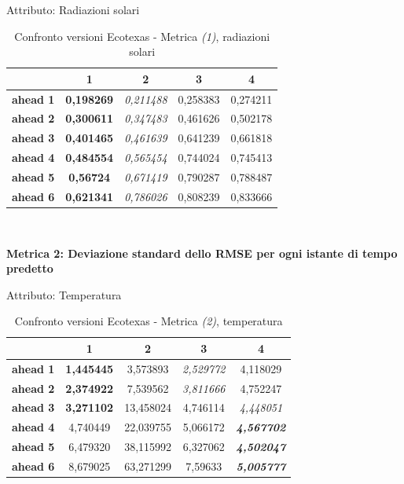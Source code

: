 \documentclass[12pt,a4paper,oneside,openright]{book}
\begin{document}
\medskip

Attributo: Radiazioni solari \\ 

\begin{table}[H]
\centering
\begin{tabular}{|c|c|c|c|c|}
\hline
& 1 & 2 & 3 & 4 \\
\hline
\textbf{ahead 1} & \textbf{0,198269} & \textit{0,211488} & 0,258383 & 0,274211\\
\hline
\textbf{ahead 2} & \textbf{0,300611} & \textit{0,347483} & 0,461626 & 0,502178\\ 
\hline
\textbf{ahead 3} & \textbf{0,401465} & \textit{0,461639} & 0,641239 & 0,661818\\
\hline
\textbf{ahead 4} & \textbf{0,484554} & \textit{0,565454} & 0,744024 & 0,745413\\ 
\hline
\textbf{ahead 5} & \textbf{0,56724} & \textit{0,671419} & 0,790287 & 0,788487\\
\hline
\textbf{ahead 6} & \textbf{0,621341} & \textit{0,786026} & 0,808239 & 0,833666\\ 
\hline
\end{tabular} \\
\caption{Confronto versioni Ecotexas - Metrica \textit{(1)}, radiazioni solari}
\end{table} 


\newpage

\textbf{Metrica 2: Deviazione standard dello RMSE per ogni istante di tempo predetto} 

\medskip

Attributo: Temperatura \\ 

\begin{table}[H]
\centering
\begin{tabular}{|c|c|c|c|c|}
\hline
& 1 & 2 & 3 & 4 \\
\hline
\textbf{ahead 1} & \textbf{1,445445} & 3,573893 & \textit{2,529772} & 4,118029\\
\hline
\textbf{ahead 2} & \textbf{2,374922} & 7,539562 & \textit{3,811666} & 4,752247\\ 
\hline
\textbf{ahead 3} & \textbf{3,271102} & 13,458024 & 4,746114 & \textit{4,448051}\\
\hline
\textbf{ahead 4} & 4,740449 & 22,039755 & 5,066172 & \textit{\textbf{4,567702}}\\ 
\hline
\textbf{ahead 5} & 6,479320 & 38,115992 & 6,327062 & \textit{\textbf{4,502047}}\\
\hline
\textbf{ahead 6} & 8,679025 & 63,271299 & 7,59633 & \textit{\textbf{5,005777}}\\ 
\hline
\end{tabular} \\
\caption{Confronto versioni Ecotexas - Metrica \textit{(2)}, temperatura}
\end{table} 
\end{document}
